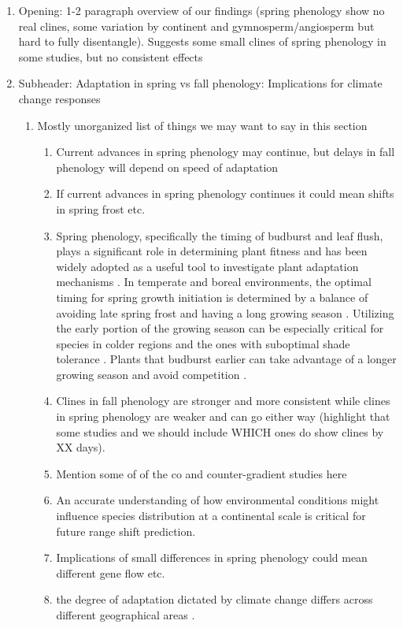 \documentclass{article}
\begin{document}
\begin{enumerate}
\item Opening: 1-2 paragraph overview of our findings (spring phenology show no real clines, some variation by continent and gymnosperm/angiosperm but hard to fully disentangle). Suggests some small clines of spring phenology in some studies, but no consistent effects
 \item Subheader: Adaptation in spring vs fall phenology: Implications for climate change responses
 \begin{enumerate}
 \item Mostly unorganized list of things we may want to say in this section
 \begin{enumerate}
 \item Current advances in spring phenology may continue, but delays in fall phenology will depend on speed of adaptation
 \item If current advances in spring phenology continues it could mean shifts in spring frost etc.
  \item Spring phenology, specifically the timing of budburst and leaf flush, plays a significant role in determining plant fitness and has been widely adopted as a useful tool to investigate plant adaptation mechanisms \citep{guo22, chuine01}. In temperate and boreal environments, the optimal timing for spring growth initiation is determined by a balance of avoiding late spring frost and having a long growing season \citep{alberto11, lenz16, allevato19}. Utilizing the early portion of the growing season can be especially critical for species in colder regions \citep{morin07, dantec15} and the ones with suboptimal shade tolerance \citep{richardson09}. Plants that budburst earlier can take advantage of a longer growing season and avoid competition  \citep{guo22}.
 \item Clines in fall phenology are stronger and more consistent while clines in spring phenology are weaker and can go either way  (highlight that some studies and we should include WHICH ones do show clines by XX days).
 \item Mention some of of the co and counter-gradient studies here
  \item  An accurate understanding of how environmental conditions might influence species distribution at a continental scale is critical for future range shift prediction.
 \item Implications of small differences in spring phenology could mean different gene flow etc. 
  \item the degree of adaptation dictated by climate change differs across different geographical areas \citep{Loarie09}. 

\end{enumerate}
\end{enumerate}
\end{enumerate}
\end{document}
